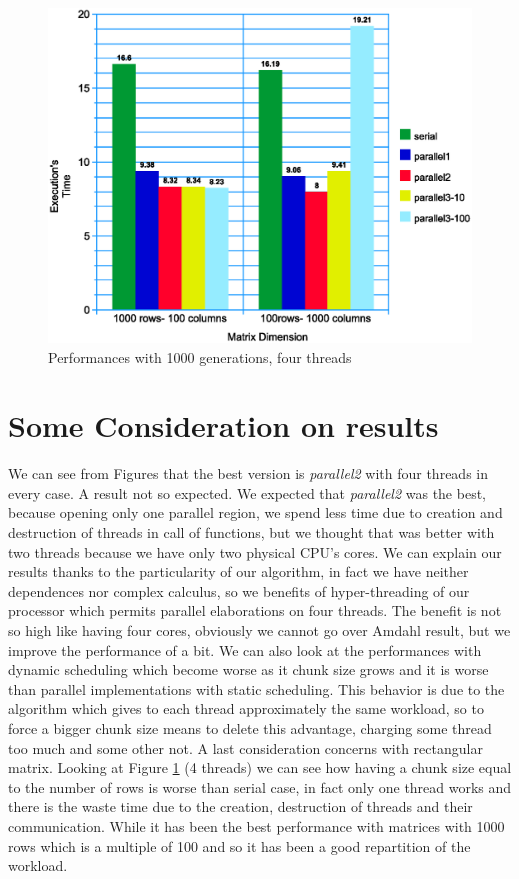 \documentclass[a4paper,11pt,twoside]{report}
\begin{document}
\begin{figure}
	\centering
	\includegraphics[scale = 0.5]{matdim.eps}
	\caption{Performances with 1000 generations, four threads} \label{fig:7}
\end{figure}

\section{Some Consideration on results}
We can see from Figures that the best version is \emph{parallel2} with four threads in every case. A result not so expected. We expected that \emph{parallel2} was the best, because opening only one parallel region, we spend less time due to creation and destruction of threads in call of functions, but we thought that was better with two threads because we have only two physical CPU's cores. We can explain our results thanks to the particularity of our algorithm, in fact we have neither dependences nor complex calculus, so we benefits of hyper-threading of our processor which permits parallel elaborations on four threads. The benefit is not so high like having four cores, obviously we cannot go over Amdahl result, but we improve the performance of a bit.
We can also look at the performances with dynamic scheduling which become worse as it chunk size grows and it is worse than parallel implementations with static scheduling. This behavior is due to
the algorithm which gives to each thread approximately the same workload, so to force a bigger chunk size means to delete this advantage, charging some thread too much and some other not.
A last consideration concerns with rectangular matrix. Looking at Figure \ref{fig:7} (4 threads) we can see how having a chunk size equal to the number of rows is worse than serial case, in fact only one thread works and there is the waste time due to the creation, destruction of threads and their communication. While it has been the best performance with matrices with 1000 rows which is a multiple of 100 and so it has been a good repartition of the workload.
\end{document}
